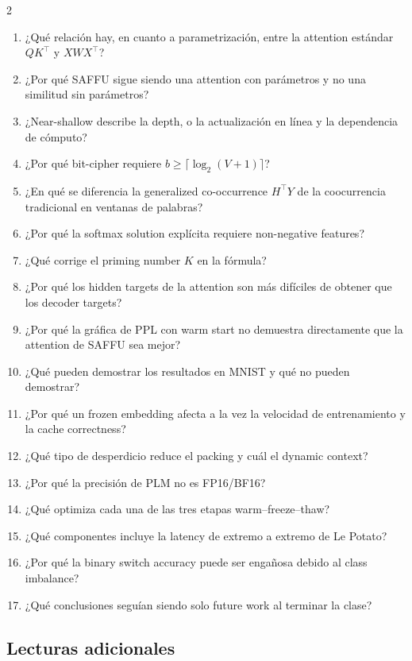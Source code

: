 \begin{multicols}{2}
\small
\begin{enumerate}
  \item ¿Qué relación hay, en cuanto a parametrización, entre la attention estándar $QK^\top$ y $XWX^\top$?
  \item ¿Por qué SAFFU sigue siendo una attention con parámetros y no una similitud sin parámetros?
  \item ¿Near-shallow describe la depth, o la actualización en línea y la dependencia de cómputo?
  \item ¿Por qué bit-cipher requiere $b\ge\lceil\log_2(V+1)\rceil$?
  \item ¿En qué se diferencia la generalized co-occurrence $H^\top Y$ de la coocurrencia tradicional en ventanas de palabras?
  \item ¿Por qué la softmax solution explícita requiere non-negative features?
  \item ¿Qué corrige el priming number $K$ en la fórmula?
  \item ¿Por qué los hidden targets de la attention son más difíciles de obtener que los decoder targets?
  \item ¿Por qué la gráfica de PPL con warm start no demuestra directamente que la attention de SAFFU sea mejor?
  \item ¿Qué pueden demostrar los resultados en MNIST y qué no pueden demostrar?
  \item ¿Por qué un frozen embedding afecta a la vez la velocidad de entrenamiento y la cache correctness?
  \item ¿Qué tipo de desperdicio reduce el packing y cuál el dynamic context?
  \item ¿Por qué la precisión de PLM no es FP16/BF16?
  \item ¿Qué optimiza cada una de las tres etapas warm--freeze--thaw?
  \item ¿Qué componentes incluye la latency de extremo a extremo de Le Potato?
  \item ¿Por qué la binary switch accuracy puede ser engañosa debido al class imbalance?
  \item ¿Qué conclusiones seguían siendo solo future work al terminar la clase?
\end{enumerate}
\end{multicols}

\subsection{Lecturas adicionales}

